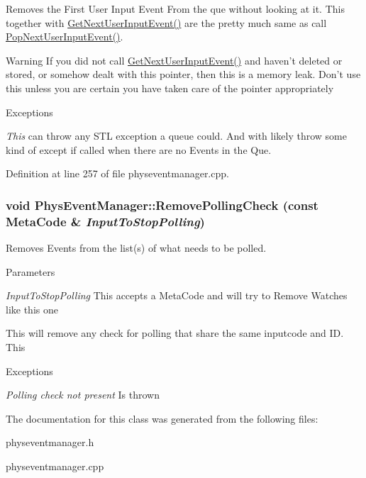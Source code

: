 Removes the First User Input Event From the que without looking at it. This together with \hyperlink{classPhysEventManager_a4874a9b1138d2351bf28e527a66c02b8}{GetNextUserInputEvent()} are the pretty much same as call \hyperlink{classPhysEventManager_ad6612a6e1c728941e2c467e7f136ca51}{PopNextUserInputEvent()}. \begin{DoxyWarning}{Warning}
If you did not call \hyperlink{classPhysEventManager_a4874a9b1138d2351bf28e527a66c02b8}{GetNextUserInputEvent()} and haven't deleted or stored, or somehow dealt with this pointer, then this is a memory leak. Don't use this unless you are certain you have taken care of the pointer appropriately 
\end{DoxyWarning}

\begin{DoxyExceptions}{Exceptions}
\item[{\em This}]can throw any STL exception a queue could. And with likely throw some kind of except if called when there are no Events in the Que. \end{DoxyExceptions}


Definition at line 257 of file physeventmanager.cpp.\hypertarget{classPhysEventManager_af81bf9a5f081f44a6cd91fdd19d4a42a}{
\subsubsection[{RemovePollingCheck}]{\setlength{\rightskip}{0pt plus 5cm}void PhysEventManager::RemovePollingCheck (const {\bf MetaCode} \& {\em InputToStopPolling})}}
\label{d5/dd7/classPhysEventManager_af81bf9a5f081f44a6cd91fdd19d4a42a}


Removes Events from the list(s) of what needs to be polled. 
\begin{DoxyParams}{Parameters}
\item[{\em InputToStopPolling}]This accepts a MetaCode and will try to Remove Watches like this one\end{DoxyParams}
This will remove any check for polling that share the same inputcode and ID. This 
\begin{DoxyExceptions}{Exceptions}
\item[{\em Polling check not present}]Is thrown \end{DoxyExceptions}


The documentation for this class was generated from the following files:\begin{DoxyCompactItemize}
\item 
physeventmanager.h\item 
physeventmanager.cpp\end{DoxyCompactItemize}
